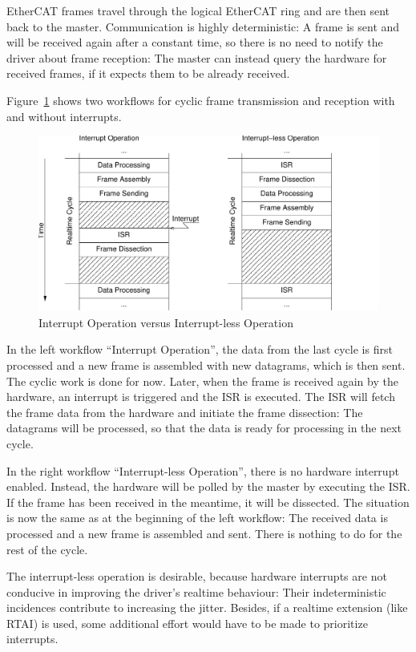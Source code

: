 \documentclass[a4paper,12pt,BCOR6mm,bibtotoc,idxtotoc]{scrbook}
\begin{document}
EtherCAT frames travel through the logical EtherCAT ring and are then sent back
to the master. Communication is highly deterministic: A frame is sent and will
be received again after a constant time, so there is no need to notify the
driver about frame reception: The master can instead query the hardware for
received frames, if it expects them to be already received.

Figure~\ref{fig:interrupt} shows two workflows for cyclic frame transmission
and reception with and without interrupts.

\begin{figure}[htbp]
  \centering
  \includegraphics[width=.9\textwidth]{images/interrupt}
  \caption{Interrupt Operation versus Interrupt-less Operation}
  \label{fig:interrupt}
\end{figure}

In the left workflow ``Interrupt Operation'', the data from the last cycle is
first processed and a new frame is assembled with new datagrams, which is then
sent.  The cyclic work is done for now.  Later, when the frame is received
again by the hardware, an interrupt is triggered and the ISR is executed. The
ISR will fetch the frame data from the hardware and initiate the frame
dissection: The datagrams will be processed, so that the data is ready for
processing in the next cycle.

In the right workflow ``Interrupt-less Operation'', there is no hardware
interrupt enabled.  Instead, the hardware will be polled by the master by
executing the ISR. If the frame has been received in the meantime, it will be
dissected. The situation is now the same as at the beginning of the left
workflow: The received data is processed and a new frame is assembled and
sent. There is nothing to do for the rest of the cycle.

The interrupt-less operation is desirable, because hardware interrupts are not
conducive in improving the driver's realtime behaviour: Their indeterministic
incidences contribute to increasing the jitter. Besides, if a realtime
extension (like RTAI) is used, some additional effort would have to be made to
prioritize interrupts.
\end{document}
